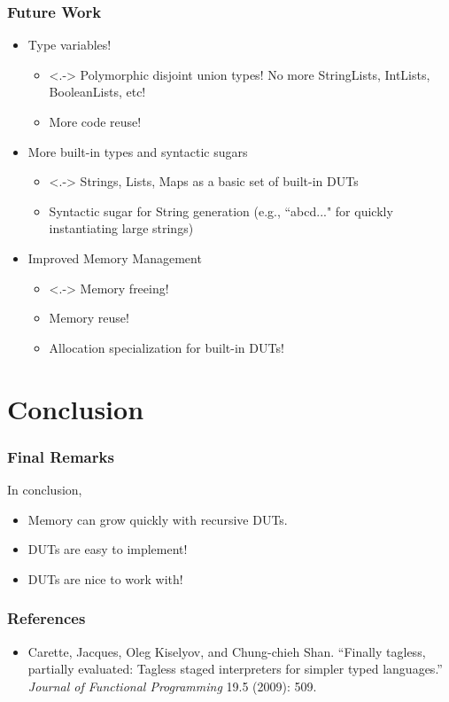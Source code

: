 \documentclass{beamer}
\begin{document}
\begin{frame}
\frametitle{Future Work}

\begin{itemize}
 \item<1-> Type variables!
 \begin{itemize}
  \item<.-> Polymorphic disjoint union types! No more StringLists, IntLists, BooleanLists, etc!
  \item More code reuse!
 \end{itemize}
 
 \item<2-> More built-in types and syntactic sugars
 \begin{itemize}
 \item<.-> Strings, Lists, Maps as a basic set of built-in DUTs
 \item Syntactic sugar for String generation (e.g., ``abcd..." for quickly instantiating large strings)
 \end{itemize}
 
 \item<3-> Improved Memory Management
 \begin{itemize}
  \item<.-> Memory freeing!
  \item Memory reuse!
  \item Allocation specialization for built-in DUTs!
 \end{itemize}

\end{itemize}

\end{frame}

\section{Conclusion}

\begin{frame}
 \frametitle{Final Remarks}
 In conclusion,
 \begin{itemize}
  \item<2-> Memory can grow quickly with recursive DUTs.
  \item<3-> DUTs are easy to implement!
  \item<4-> DUTs are nice to work with!
 \end{itemize}

\end{frame}


\begin{frame}
\frametitle{References}
\begin{itemize}
 \item Carette, Jacques, Oleg Kiselyov, and Chung-chieh Shan. ``Finally tagless, partially evaluated: Tagless staged interpreters for simpler typed languages.'' \textit{Journal of Functional Programming} 19.5 (2009): 509.
\end{itemize}

\end{frame}
\end{document}
